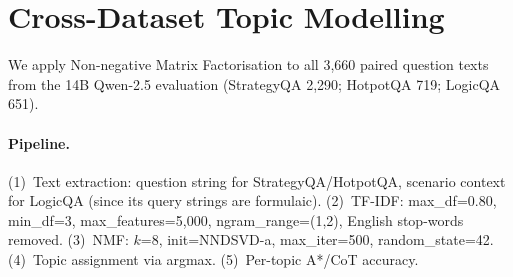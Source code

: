 \documentclass[11pt]{article}
\begin{document}


\section{Cross-Dataset Topic Modelling}
\label{app:topics}

We apply Non-negative Matrix Factorisation \cite[NMF;][]{lee1999learning} to all 3,660 paired question texts from the 14B Qwen-2.5 evaluation (StrategyQA 2,290; HotpotQA 719; LogicQA 651).

\paragraph{Pipeline.} (1)~Text extraction: question string for StrategyQA/HotpotQA, scenario context for LogicQA (since its query strings are formulaic). (2)~TF-IDF: max\_df=0.80, min\_df=3, max\_features=5,000, ngram\_range=(1,2), English stop-words removed. (3)~NMF: $k$=8, init=NNDSVD-a, max\_iter=500, random\_state=42. (4)~Topic assignment via argmax. (5)~Per-topic A*/CoT accuracy.
\end{document}
